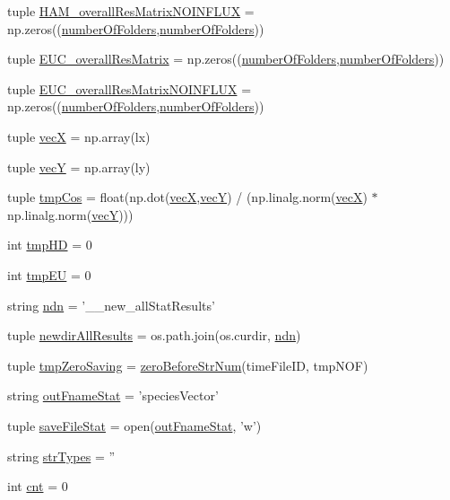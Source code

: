 \begin{DoxyCompactItemize}
\item 
tuple \hyperlink{a00091_a6ea74abf4c94200ed1b27d892ecacc97}{H\-A\-M\-\_\-overall\-Res\-Matrix\-N\-O\-I\-N\-F\-L\-U\-X} = np.\-zeros((\hyperlink{a00091_a3a2fe097086bb0f4a505fca8f53dc2b0}{number\-Of\-Folders},\hyperlink{a00091_a3a2fe097086bb0f4a505fca8f53dc2b0}{number\-Of\-Folders}))
\item 
tuple \hyperlink{a00091_a63ee1925f76a40d04495e9b35c0973d2}{E\-U\-C\-\_\-overall\-Res\-Matrix} = np.\-zeros((\hyperlink{a00091_a3a2fe097086bb0f4a505fca8f53dc2b0}{number\-Of\-Folders},\hyperlink{a00091_a3a2fe097086bb0f4a505fca8f53dc2b0}{number\-Of\-Folders}))
\item 
tuple \hyperlink{a00091_a4f2ecc559d2c5d79bb138a2e8ced8127}{E\-U\-C\-\_\-overall\-Res\-Matrix\-N\-O\-I\-N\-F\-L\-U\-X} = np.\-zeros((\hyperlink{a00091_a3a2fe097086bb0f4a505fca8f53dc2b0}{number\-Of\-Folders},\hyperlink{a00091_a3a2fe097086bb0f4a505fca8f53dc2b0}{number\-Of\-Folders}))
\item 
tuple \hyperlink{a00091_a55e7171c96f320a08ad29f21ad5faf9a}{vec\-X} = np.\-array(lx)
\item 
tuple \hyperlink{a00091_aaa4ad55a8fe44bfc5a386dff027886b0}{vec\-Y} = np.\-array(ly)
\item 
tuple \hyperlink{a00091_a547703ec10e432928645bbe8d226dceb}{tmp\-Cos} = float(np.\-dot(\hyperlink{a00091_a55e7171c96f320a08ad29f21ad5faf9a}{vec\-X},\hyperlink{a00091_aaa4ad55a8fe44bfc5a386dff027886b0}{vec\-Y}) / (np.\-linalg.\-norm(\hyperlink{a00091_a55e7171c96f320a08ad29f21ad5faf9a}{vec\-X}) $\ast$ np.\-linalg.\-norm(\hyperlink{a00091_aaa4ad55a8fe44bfc5a386dff027886b0}{vec\-Y})))
\item 
int \hyperlink{a00091_a35b7af9eb7cd962d33c5d56eae794c7b}{tmp\-H\-D} = 0
\item 
int \hyperlink{a00091_a9019a56cfd992899ffc519204307a8ae}{tmp\-E\-U} = 0
\item 
string \hyperlink{a00091_ab0e0a55161ee1fd9fb0f086a328f67b7}{ndn} = '\-\_\-\_\-new\-\_\-all\-Stat\-Results'
\item 
tuple \hyperlink{a00091_aaf0f6fcbaaf97dcff16b62e86df0209c}{newdir\-All\-Results} = os.\-path.\-join(os.\-curdir, \hyperlink{a00091_ab0e0a55161ee1fd9fb0f086a328f67b7}{ndn})
\item 
tuple \hyperlink{a00091_ae86fc9dc3283934244ec28446445f722}{tmp\-Zero\-Saving} = \hyperlink{a00091_a52efd37e3719214b7a4c7c46842ae229}{zero\-Before\-Str\-Num}(time\-File\-I\-D, tmp\-N\-O\-F)
\item 
string \hyperlink{a00091_a05e902a00f3333a303563029c80605de}{out\-Fname\-Stat} = 'species\-Vector'
\item 
tuple \hyperlink{a00091_a372b8cd0e4d3200958e9c61e3a276fb1}{save\-File\-Stat} = open(\hyperlink{a00091_a05e902a00f3333a303563029c80605de}{out\-Fname\-Stat}, 'w')
\item 
string \hyperlink{a00091_a80aeec3ef5cc335351588c6f7c4b76cb}{str\-Types} = ''
\item 
int \hyperlink{a00091_aabada0bdbcd7fb71d37a9310d32f0a28}{cnt} = 0
\end{DoxyCompactItemize}


